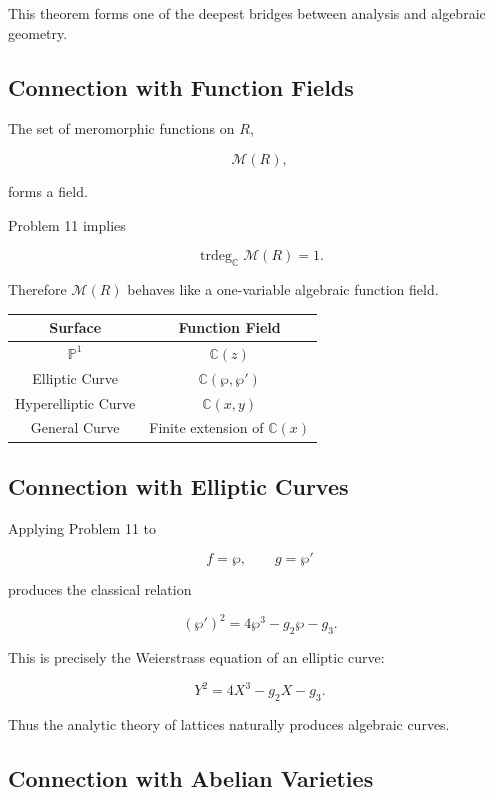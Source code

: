 \documentclass[12pt,a4paper]{article}
\theoremstyle{notespace}
\begin{document}
This theorem forms one of the deepest bridges between analysis and algebraic geometry.

\subsection{Connection with Function Fields}

The set of meromorphic functions on \(R\),

\[
\mathcal M(R),
\]

forms a field.

Problem 11 implies

\[
\operatorname{trdeg}_{\mathbb C}
\mathcal M(R)
=
1.
\]

Therefore \(\mathcal M(R)\) behaves like a one-variable algebraic function field.

\begin{center}
	\renewcommand{\arraystretch}{1.4}
	\begin{tabular}{|c|c|}
		\hline
		\rowcolor{blue!15}
		Surface & Function Field\\
		\hline
		\(\mathbb P^1\)
		&
		\(\mathbb C(z)\)
		\\
		\hline
		Elliptic Curve
		&
		\(\mathbb C(\wp,\wp')\)
		\\
		\hline
		Hyperelliptic Curve
		&
		\(\mathbb C(x,y)\)
		\\
		\hline
		General Curve
		&
		Finite extension of \(\mathbb C(x)\)
		\\
		\hline
	\end{tabular}
\end{center}

\subsection{Connection with Elliptic Curves}

Applying Problem 11 to

\[
f=\wp,
\qquad
g=\wp'
\]

produces the classical relation

\[
(\wp')^2
=
4\wp^3-g_2\wp-g_3.
\]

This is precisely the Weierstrass equation of an elliptic curve:

\[
Y^2
=
4X^3-g_2X-g_3.
\]

Thus the analytic theory of lattices naturally produces algebraic curves.

\subsection{Connection with Abelian Varieties}
\end{document}
